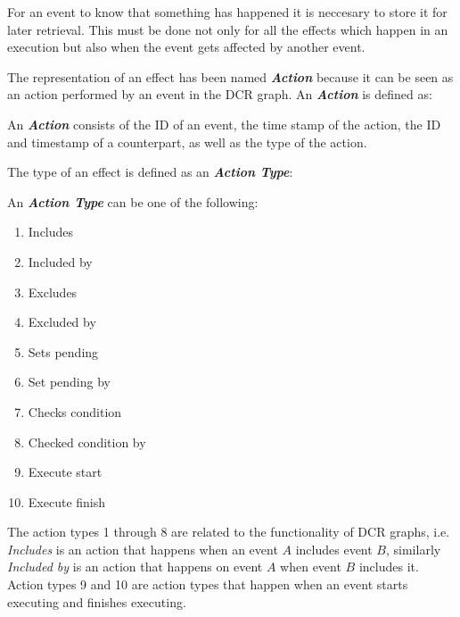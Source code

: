 	\newpar For an event to know that something has happened it is neccesary to store it for later retrieval. This must be done not only for all the effects which happen in an execution but also when the event gets affected by another event.
	
	\newpar The representation of an effect has been named \textit{\textbf{Action}} because it can be seen as an action performed by an event in the DCR graph. An \textit{\textbf{Action}} is defined as:
	
	\begin{definition}
		An \textit{\textbf{Action}} consists of the ID of an event, the time stamp of the action, the ID and timestamp of a counterpart, as well as the type of the action.
	\end{definition}
	
	\newpar	The type of an effect is defined as an \textit{\textbf{Action Type}}:
	
	\begin{definition}
        \label{def:actiontype}
		An \textit{\textbf{Action Type}} can be one of the following:
		\begin{multicols}{3}
			\begin{enumerate}
				\item Includes\label{actiontype:includes}
				\item Included by\label{actiontype:includedby}
				\item Excludes\label{actiontype:excludes}
				\item Excluded by\label{actiontype:excludedby}
				\item Sets pending\label{actiontype:setspending}
				\item Set pending by\label{actiontype:setpendingby}
				\item Checks condition\label{actiontype:checkscondition}
				\item Checked condition by\label{actiontype:checkedconditionby}
				\item Execute start
				\item Execute finish
			\end{enumerate}
		\end{multicols}
	\end{definition}
	
	\newpar The action types 1 through 8 are related to the functionality of DCR graphs, i.e. \textit{Includes} is an action that happens when an event $A$ includes event $B$, similarly \textit{Included by} is an action that happens on event $A$ when event $B$ includes it. Action types 9 and 10 are action types that happen when an event starts executing and finishes executing. 
    
